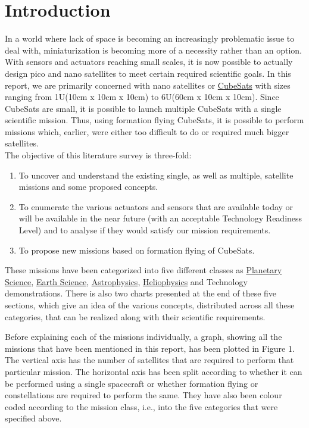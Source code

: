 \section{Introduction}
In a world where lack of space is becoming an increasingly problematic issue to deal with, miniaturization is becoming more of  a necessity rather than an option. With sensors and actuators reaching small scales, it is now possible to actually design pico and nano satellites to meet certain required scientific goals. In this report, we are primarily concerned with nano satellites or \href{http://www.cubesat.org/images/developers/cds_rev12.pdf}{CubeSats} with sizes ranging from 1U(10cm x 10cm x 10cm) to 6U(60cm x 10cm x 10cm). Since CubeSats are small, it is possible to launch multiple CubeSats with a single scientific mission. Thus, using formation flying CubeSats, it is possible to perform missions which, earlier, were either too difficult to do or required much bigger satellites. \\

The objective of this literature survey is three-fold: 
\begin{enumerate}
\item To uncover and understand the existing single, as well as multiple, satellite missions and some proposed concepts.
\item To enumerate the various actuators and sensors that are available today or will be available in the near future (with an acceptable Technology Readiness Level) and to analyse if they would satisfy our mission requirements. 
\item To propose new missions based on formation flying of CubeSats.
\end{enumerate}


These missions have been categorized into five different classes as \href{http://solarsystem.nasa.gov/multimedia/download-detail.cfm?DL_ID=742}{Planetary Science}, \href{http://www.nap.edu/catalog.php?record_id=11820}{Earth Science}, \href{http://www.nap.edu/catalog.php?record_id=12951}{Astrophysics}, \href{http://www.nap.edu/catalog.php?record_id=13060}{Heliophysics} and Technology demonstrations. There is also two charts presented at the end of these five sections, which give an idea of the various concepts, distributed across all these categories, that can be realized along with their scientific requirements. 

Before explaining each of the missions individually, a graph, showing all the missions that have been mentioned in this report, has been plotted in Figure 1. The vertical axis has the number of satellites that are required to perform that particular mission. The horizontal axis has been split according to whether it can be performed using a single spacecraft or whether formation flying or constellations are required to perform the same. They have also been colour coded according to the mission class, i.e., into the five categories that were specified above. 

